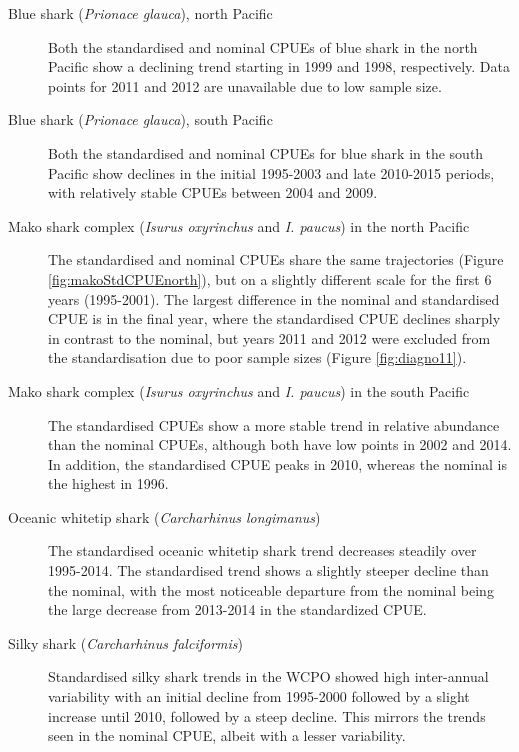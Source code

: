 \begin{description}
\item[Blue shark (\emph{Prionace glauca}), north Pacific] Both the standardised and nominal CPUEs of blue shark in the north Pacific show a declining trend starting in 1999 and 1998, respectively. Data points for 2011 and 2012 are unavailable due to low sample size.  
 
 \item[Blue shark (\emph{Prionace glauca}), south Pacific]  Both the standardised and nominal CPUEs for blue shark in the south Pacific show declines in the initial 1995-2003 and late 2010-2015 periods, with relatively stable CPUEs between 2004  and 2009.  
 
 \item[Mako shark complex (\emph{Isurus oxyrinchus} and \emph{I. paucus}) in the north Pacific] The standardised and nominal CPUEs share the same trajectories (Figure \ref{fig:makoStdCPUEnorth}), but on a slightly different scale for the first 6 years (1995-2001).  The largest difference in the nominal and standardised CPUE is in the final year, where the standardised CPUE declines sharply in contrast to the nominal, but years 2011 and 2012 were excluded from the standardisation due to poor sample sizes (Figure \ref{fig:diagno11}).
 
\item[Mako shark complex (\emph{Isurus oxyrinchus} and \emph{I. paucus}) in the south Pacific] The standardised CPUEs show a more stable trend in relative abundance than the nominal CPUEs, although both have low points in 2002 and 2014. In addition, the standardised CPUE peaks in 2010, whereas the nominal is the highest in 1996.
 
\item[Oceanic whitetip shark (\emph{Carcharhinus longimanus})] The standardised oceanic whitetip shark trend decreases steadily over 1995-2014.  The standardised trend shows a slightly steeper decline than the nominal, with the most noticeable departure from the nominal being the large decrease from 2013-2014 in the standardized CPUE.%
 
 \item[Silky shark (\emph{Carcharhinus falciformis})] Standardised silky shark trends in the WCPO showed high inter-annual variability with an initial decline from 1995-2000 followed by a slight increase until 2010, followed by a steep decline. This mirrors the trends seen in the nominal CPUE, albeit with a lesser variability.
 

\end{description}

